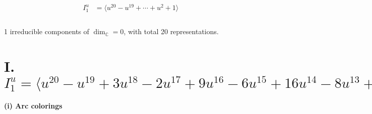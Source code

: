 \documentclass[1p]{elsarticle_modified}
\theoremstyle{definition}
\begin{document}
\begin{align*}
I^u_{1}&=\langle 
u^{20}- u^{19}+\cdots+u^2+1\rangle \\
\\
\end{align*}
\raggedright * 1 irreducible components of $\dim_{\mathbb{C}}=0$, with total 20 representations.\\
\newpage
\renewcommand{\arraystretch}{1}
\centering \section*{I. $I^u_{1}= \langle u^{20}- u^{19}+3 u^{18}-2 u^{17}+9 u^{16}-6 u^{15}+16 u^{14}-8 u^{13}+24 u^{12}-9 u^{11}+25 u^{10}-6 u^9+21 u^8+10 u^6+4 u^5+3 u^4+3 u^3+u^2+1 \rangle$}
\flushleft \textbf{(i) Arc colorings}\\
\end{document}
